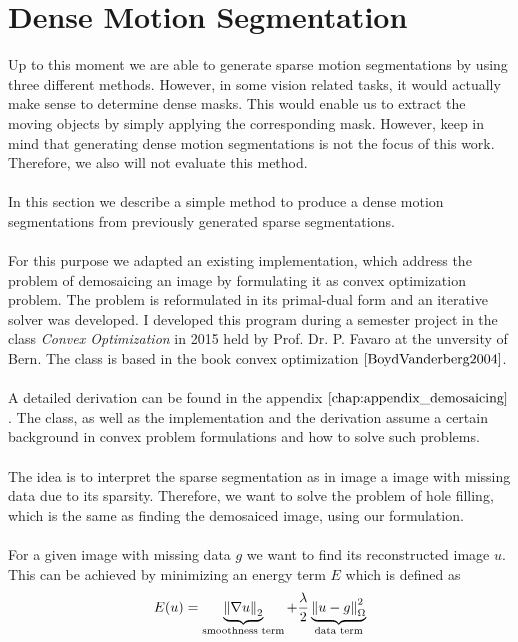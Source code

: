 \section{Dense Motion Segmentation}
\label{sec:dense_motion_segmentation}
Up to this moment we are able to generate sparse motion segmentations by using three different methods. However, in some vision related tasks, it would actually make sense to determine dense masks. This would enable us to extract the moving objects by simply applying the corresponding mask. However, keep in mind that generating dense motion segmentations is not the focus of this work. Therefore, we also will not evaluate this method. \\ \\
In this section we describe a simple method to produce a dense motion segmentations from previously generated sparse segmentations. \\ \\
For this purpose we adapted an existing implementation, which address the problem of demosaicing an image by formulating it as convex optimization problem. The problem is reformulated in its primal-dual form and an iterative solver was developed. I developed this program during a semester project in the class \textit{Convex Optimization} in 2015 held by Prof. Dr. P. Favaro at the unversity of Bern. The class is based in the book convex optimization $\cite{BoydVanderberg2004}$. \\ \\
A detailed derivation can be found in the appendix $\ref{chap:appendix_demosaicing}$. The class, as well as the implementation and the derivation assume a certain background in convex problem formulations and how to solve such problems. \\ \\
The idea is to interpret the sparse segmentation as in image a image with missing data due to its sparsity. Therefore, we want to solve the problem of hole filling, which is the same as finding the demosaiced image, using our formulation. \\ \\
For a given image with missing data $g$ we want to find its reconstructed image $u$. This can be achieved by minimizing an energy term $E$ which is defined as 
\begin{equation}
	E(u) = \underbrace{\left\lVert\nabla u\right\rVert_2}_{\text{smoothness term}} + \frac{\lambda}{2} \underbrace{\left\lVert u - g\right\rVert^2_{\Omega}}_{\text{data term}}	
\end{equation}
